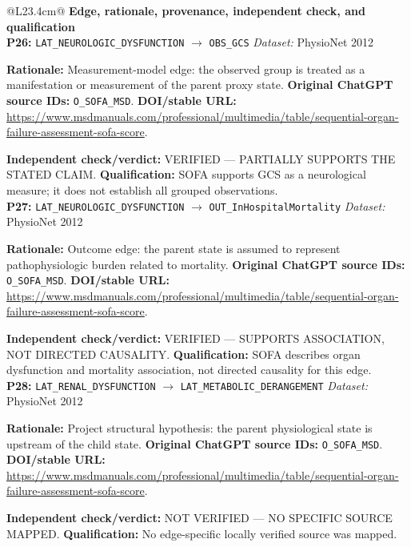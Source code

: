 \begin{tabular}{@{}L{23.4cm}@{}}
\toprule
\textbf{Edge, rationale, provenance, independent check, and qualification}\\
\midrule
\textbf{P26:} \nolinkurl{LAT_NEUROLOGIC_DYSFUNCTION} $\rightarrow$ \nolinkurl{OBS_GCS} \hfill \textit{Dataset:} PhysioNet 2012\par\textbf{Rationale:} Measurement-model edge: the observed group is treated as a manifestation or measurement of the parent proxy state. \textbf{Original ChatGPT source IDs:} \nolinkurl{O_SOFA_MSD}. \textbf{DOI/stable URL:} \url{https://www.msdmanuals.com/professional/multimedia/table/sequential-organ-failure-assessment-sofa-score}.\par\textbf{Independent check/verdict:} VERIFIED --- PARTIALLY SUPPORTS THE STATED CLAIM. \textbf{Qualification:} SOFA supports GCS as a neurological measure; it does not establish all grouped observations. \\
\addlinespace[2pt]
\midrule
\textbf{P27:} \nolinkurl{LAT_NEUROLOGIC_DYSFUNCTION} $\rightarrow$ \nolinkurl{OUT_InHospitalMortality} \hfill \textit{Dataset:} PhysioNet 2012\par\textbf{Rationale:} Outcome edge: the parent state is assumed to represent pathophysiologic burden related to mortality. \textbf{Original ChatGPT source IDs:} \nolinkurl{O_SOFA_MSD}. \textbf{DOI/stable URL:} \url{https://www.msdmanuals.com/professional/multimedia/table/sequential-organ-failure-assessment-sofa-score}.\par\textbf{Independent check/verdict:} VERIFIED --- SUPPORTS ASSOCIATION, NOT DIRECTED CAUSALITY. \textbf{Qualification:} SOFA describes organ dysfunction and mortality association, not directed causality for this edge. \\
\addlinespace[2pt]
\midrule
\textbf{P28:} \nolinkurl{LAT_RENAL_DYSFUNCTION} $\rightarrow$ \nolinkurl{LAT_METABOLIC_DERANGEMENT} \hfill \textit{Dataset:} PhysioNet 2012\par\textbf{Rationale:} Project structural hypothesis: the parent physiological state is upstream of the child state. \textbf{Original ChatGPT source IDs:} \nolinkurl{O_SOFA_MSD}. \textbf{DOI/stable URL:} \url{https://www.msdmanuals.com/professional/multimedia/table/sequential-organ-failure-assessment-sofa-score}.\par\textbf{Independent check/verdict:} NOT VERIFIED --- NO SPECIFIC SOURCE MAPPED. \textbf{Qualification:} No edge-specific locally verified source was mapped. \\

\end{tabular}
